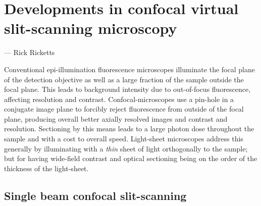 \ifpdf
    \graphicspath{{Chapters/dualslit/Figs/Raster/}{Chapters/dualslit/Figs/PDF/}{Chapters/dualslit/Figs/}}
\else
    \graphicspath{{Chapters/dualslit/Figs/Vector/}{Chapters/dualslit/Figs/}}
\fi

\chapter{Developments in confocal virtual slit-scanning microscopy}\label{chapter:dualslit}

\epigraph{\emph{}}{--- Rick Ricketts}


Conventional epi-illumination fluorescence microscopes illuminate the focal plane of the detection objective as well as a large fraction of the sample outside the focal plane.
This leads to background intensity due to out-of-focus fluorescence, affecting resolution and contrast.
Confocal-microscopes use a pin-hole in a conjugate image plane to forcibly reject fluorescence from outside of the focal plane, producing overall better axially resolved images and contrast and resolution.
Sectioning by this means leads to a large photon dose throughout the sample and with a cost to overall speed.
Light-sheet microscopes address this generally by illuminating with a \emph{thin} sheet of light orthogonally to the sample; but for having wide-field contrast and optical sectioning being on the order of the thickness of the light-sheet.

\pagebreak

\section{Single beam confocal slit-scanning}

